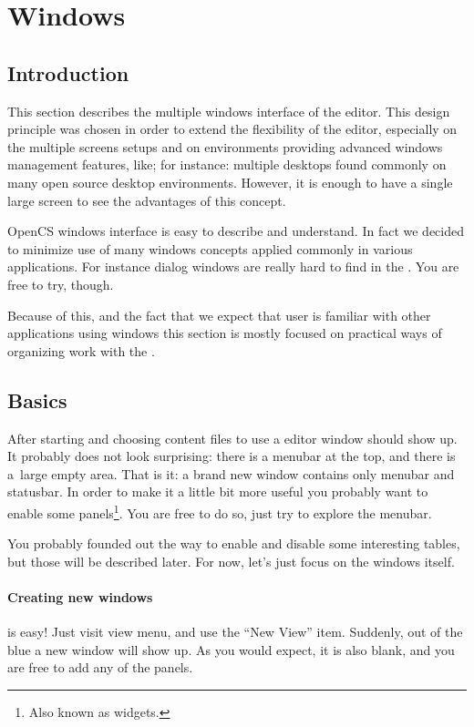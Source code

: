 \section{Windows}
\subsection{Introduction}
This section describes the multiple windows interface of the \OCS{} editor. This design principle was chosen in order
to extend the flexibility of the editor, especially on the multiple screens setups and on environments providing advanced
windows management features, like; for instance: multiple desktops found commonly on many open source desktop environments.
However, it is enough to have a single large screen to see the advantages of this concept.

OpenCS windows interface is easy to describe and understand. In fact we decided to minimize use of many windows concepts
applied commonly in various applications. For instance dialog windows are really hard to find in the \OCS. You are free to try,
though.

Because of this, and the fact that we expect that user is familiar with other applications using windows this section is mostly
focused on practical ways of organizing work with the \OCS.

\subsection{Basics}
After starting \OCS{} and choosing content files to use a editor window should show up. It probably does not look surprising:
there is a menubar at the top, and there is a~large empty area. That is it: a brand new \OCS{} window contains only menubar
and statusbar. In order to make it a little bit more useful you probably want to enable some panels\footnote{Also known as widgets.}.
You are free to do so, just try to explore the menubar.

You probably founded out the way to enable and disable some interesting tables, but those will be described later. For now, let's
just focus on the windows itself.

\paragraph{Creating new windows}
is easy! Just visit view menu, and use the ``New View'' item. Suddenly, out of the blue a new window will show up. As you would expect,
it is also blank, and you are free to add any of the \OCS{} panels.

